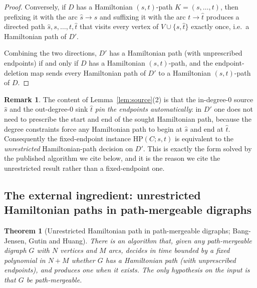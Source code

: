 \documentclass[12pt]{article}
\newtheorem{theorem}{Theorem}
\theoremstyle{definition}
\newtheorem{remark}{Remark}
\newcommand{\Vv}{V}
\begin{document}
\begin{proof}
Conversely, if $D$ has a Hamiltonian $(s,t)$-path $K=(s,\dots,t)$, then prefixing
it with the arc $\hat s\to s$ and suffixing it with the arc $t\to\hat t$ produces a
directed path $\hat s,s,\dots,t,\hat t$ that visits every vertex of
$\Vv\cup\{\hat s,\hat t\}$ exactly once, i.e.\ a Hamiltonian path of $D'$.

Combining the two directions, $D'$ has a Hamiltonian path (with unprescribed
endpoints) if and only if $D$ has a Hamiltonian $(s,t)$-path, and the
endpoint-deletion map sends every Hamiltonian path of $D'$ to a Hamiltonian
$(s,t)$-path of $D$.
\end{proof}

\begin{remark}\label{rem:why-unrestricted}
The content of Lemma~\ref{lem:source}(2) is that the in-degree-$0$ source
$\hat s$ and the out-degree-$0$ sink $\hat t$ \emph{pin the endpoints
automatically}: in $D'$ one does not need to prescribe the start and end of the
sought Hamiltonian path, because the degree constraints force any Hamiltonian path
to begin at $\hat s$ and end at $\hat t$. Consequently the fixed-endpoint instance
$\mathrm{HP}(C;s,t)$ is equivalent to the \emph{unrestricted} Hamiltonian-path
decision on $D'$. This is exactly the form solved by the published algorithm we
cite below, and it is the reason we cite the unrestricted result rather than a
fixed-endpoint one.
\end{remark}

\subsection{The external ingredient: unrestricted Hamiltonian paths in
path-mergeable digraphs}

\begin{theorem}[Unrestricted Hamiltonian path in path-mergeable digraphs;
Bang-Jensen, Gutin and Huang]\label{thm:bgh}
There is an algorithm that, given any path-mergeable digraph $G$ with $N$ vertices
and $M$ arcs, decides in time bounded by a fixed polynomial in $N+M$ whether $G$
has a Hamiltonian path \emph{(with unprescribed endpoints)}, and produces one when
it exists. The only hypothesis on the input is that $G$ be path-mergeable.
\end{theorem}
\end{document}
